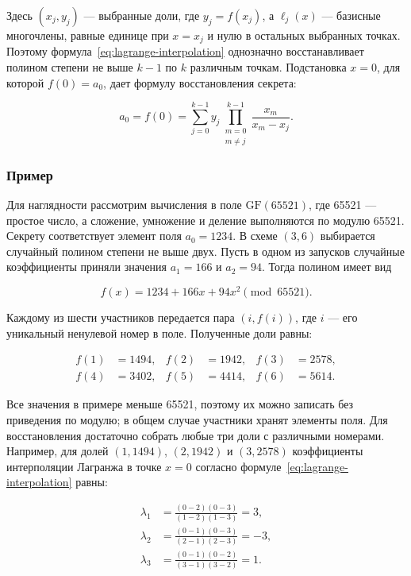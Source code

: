 Здесь \((x_j,y_j)\) --- выбранные доли, где \(y_j=f(x_j)\), а \(\ell_j(x)\) --- базисные многочлены, равные единице при \(x=x_j\) и нулю в остальных выбранных точках. Поэтому формула~\eqref{eq:lagrange-interpolation} однозначно восстанавливает полином степени не выше \(k-1\) по \(k\) различным точкам. \newpage Подстановка \(x=0\), для которой \(f(0)=a_0\), дает формулу восстановления секрета:

\begin{equation}
a_0 = f(0) = \sum_{j=0}^{k-1} y_j \prod_{\substack{m=0\\m \neq j}}^{k-1} \frac{x_m}{x_m - x_j}.
\end{equation}

\subsubsection{Пример}

Для наглядности рассмотрим вычисления в поле \(\mathrm{GF}(65521)\), где 65521 --- простое число, а сложение, умножение и деление выполняются по модулю 65521. Секрету соответствует элемент поля \(a_0=1234\). В схеме \((3,6)\) выбирается случайный полином степени не выше двух. Пусть в одном из запусков случайные коэффициенты приняли значения \(a_1=166\) и \(a_2=94\). Тогда полином имеет вид

\begin{equation}
f(x) = 1234 + 166x + 94x^2 \pmod{65521}.
\end{equation}

Каждому из шести участников передается пара \((i,f(i))\), где \(i\) --- его уникальный ненулевой номер в поле. Полученные доли равны:

\begin{equation}
\begin{aligned}
f(1) &= 1494, & f(2) &= 1942, & f(3) &= 2578,\\
f(4) &= 3402, & f(5) &= 4414, & f(6) &= 5614.
\end{aligned}
\end{equation}

Все значения в примере меньше 65521, поэтому их можно записать без приведения по модулю; в общем случае участники хранят элементы поля. Для восстановления достаточно собрать любые три доли с различными номерами. Например, для долей \((1,1494)\), \((2,1942)\) и \((3,2578)\) коэффициенты интерполяции Лагранжа в точке \(x=0\) согласно формуле~\eqref{eq:lagrange-interpolation} равны:

\begin{equation}
\begin{aligned}
\lambda_1 &= \frac{(0-2)(0-3)}{(1-2)(1-3)}=3, \\
\lambda_2 &= \frac{(0-1)(0-3)}{(2-1)(2-3)}=-3, \\
\lambda_3 &= \frac{(0-1)(0-2)}{(3-1)(3-2)}=1.
\end{aligned}
\end{equation}


